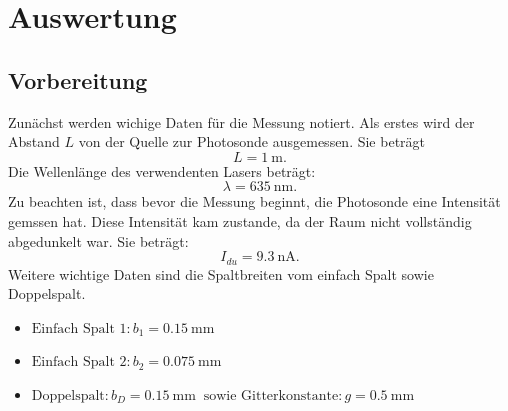 \section{Auswertung}
\subsection{Vorbereitung}
Zunächst werden wichige Daten für die Messung notiert.
Als erstes wird der Abstand $L$ von der Quelle zur Photosonde ausgemessen.
Sie beträgt
\begin{equation*}
  L = \SI{1}{\metre}.
\end{equation*}
Die Wellenlänge des verwendenten Lasers beträgt:
\begin{equation*}
  \lambda = \SI{635}{\nano\metre}.
\end{equation*}
Zu beachten ist, dass bevor die Messung beginnt, die Photosonde eine
Intensität gemssen hat. Diese Intensität kam zustande, da der Raum nicht vollständig
abgedunkelt war.
Sie beträgt:
\begin{equation*}
  I_{du} = \SI{9.3}{\nano\ampere}.
\end{equation*}
Weitere wichtige Daten sind die Spaltbreiten vom einfach Spalt sowie Doppelspalt.
\begin{itemize}
  \item $\text{Einfach Spalt 1:} \, b_1 = \SI{0.15}{\milli\metre}$
  \item $\text{Einfach Spalt 2:} \, b_2 = \SI{0.075}{\milli\metre}$
  \item $\text{Doppelspalt:} \, b_D = \SI{0.15}{\milli\metre} \,\,\ \text{sowie Gitterkonstante:}\, g = \SI{0.5}{\milli\metre}$
\end{itemize}

